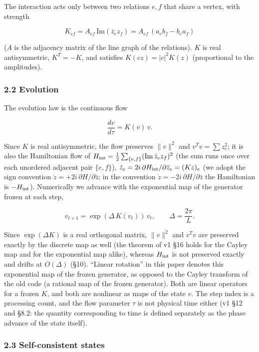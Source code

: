 \documentclass[
  10pt,
  a4paper,
]{article}
\begin{document}
The interaction acts only between two relations \(e,f\) that share a
vertex, with strength

\[
K_{ef}=A_{ef}\,\mathrm{Im}(\bar z_e z_f)=A_{ef}\,(a_eb_f-b_ea_f)
\]

(\(A\) is the adjacency matrix of the line graph of the relations).
\(K\) is real antisymmetric, \(K^T=-K\), and satisfies
\(K(cz)=|c|^2K(z)\) (proportional to the amplitudes).

\subsubsection{2.2 Evolution}\label{evolution}

The evolution law is the continuous flow

\[
\frac{dv}{d\tau}=K(v)\,v .
\]

Since \(K\) is real antisymmetric, the flow preserves \(\|v\|^2\) and
\(v^Tv=\sum z_e^2\); it is also the Hamiltonian flow of
\(H_{\rm int}=\tfrac12\sum_{\{e,f\}}(\mathrm{Im}\,\bar z_ez_f)^2\) (the
sum runs once over each unordered adjacent pair \(\{e,f\}\)),
\(\dot z_e=2i\,\partial H_{\rm int}/\partial\bar z_e=(Kz)_e\) (we adopt
the sign convention \(\dot z=+2i\,\partial H/\partial\bar z\); in the
convention \(\dot z=-2i\,\partial H/\partial\bar z\) the Hamiltonian is
\(-H_{\rm int}\)). Numerically we advance with the exponential map of
the generator frozen at each step,

\[
v_{t+1}=\exp(\Delta\,K(v_t))\,v_t,\qquad \Delta=\frac{2\pi}{L}.
\]

Since \(\exp(\Delta K)\) is a real orthogonal matrix, \(\|v\|^2\) and
\(v^Tv\) are preserved exactly by the discrete map as well (the theorem
of v1 §16 holds for the Cayley map and for the exponential map alike),
whereas \(H_{\rm int}\) is not preserved exactly and drifts at
\(O(\Delta)\) (§10). ``Linear rotation'' in this paper denotes this
exponential map of the frozen generator, as opposed to the Cayley
transform of the old code (a rational map of the frozen generator). Both
are linear operators for a frozen \(K\), and both are nonlinear as maps
of the state \(v\). The step index is a processing count, and the flow
parameter \(\tau\) is not physical time either (v1 §12 and §8.2: the
quantity corresponding to time is defined separately as the phase
advance of the state itself).

\subsubsection{2.3 Self-consistent states}\label{self-consistent-states}
\end{document}
